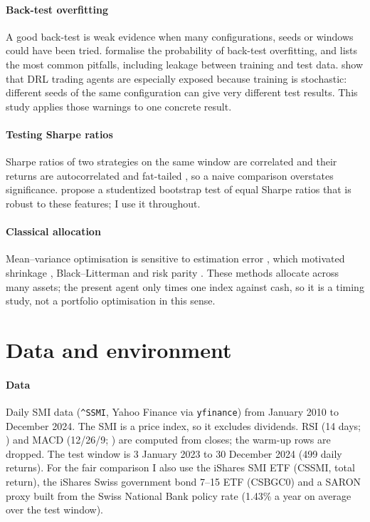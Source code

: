 \documentclass[11pt,a4paper]{article}
\begin{document}
\paragraph{Back-test overfitting} A good back-test is weak evidence when many configurations, seeds or windows could have been tried. \citet{bailey2017} formalise the probability of back-test overfitting, and \citet{lopezdeprado2018} lists the most common pitfalls, including leakage between training and test data. \citet{gort2022} show that DRL trading agents are especially exposed because training is stochastic: different seeds of the same configuration can give very different test results. This study applies those warnings to one concrete result.

\paragraph{Testing Sharpe ratios} Sharpe ratios \citep{sharpe1966,sharpe1994} of two strategies on the same window are correlated and their returns are autocorrelated and fat-tailed \citep{mandelbrot1963}, so a naive comparison overstates significance. \citet{ledoit2008} propose a studentized bootstrap test of equal Sharpe ratios that is robust to these features; I use it throughout.

\paragraph{Classical allocation} Mean--variance optimisation \citep{markowitz1952} is sensitive to estimation error \citep{michaud1989}, which motivated shrinkage \citep{ledoit2004}, Black--Litterman \citep{black1992} and risk parity \citep{maillard2010}. These methods allocate across many assets; the present agent only times one index against cash, so it is a timing study, not a portfolio optimisation in this sense.

\section{Data and environment}

\paragraph{Data} Daily SMI data (\texttt{\^{}SSMI}, Yahoo Finance via \texttt{yfinance}) from January 2010 to December 2024. The SMI is a price index, so it excludes dividends. RSI (14 days; \citealp{wilder1978}) and MACD (12/26/9; \citealp{appel2005}) are computed from closes; the warm-up rows are dropped. The test window is 3 January 2023 to 30 December 2024 (499 daily returns). For the fair comparison I also use the iShares SMI ETF (CSSMI, total return), the iShares Swiss government bond 7--15 ETF (CSBGC0) and a SARON proxy built from the Swiss National Bank policy rate (1.43\% a year on average over the test window).
\end{document}
